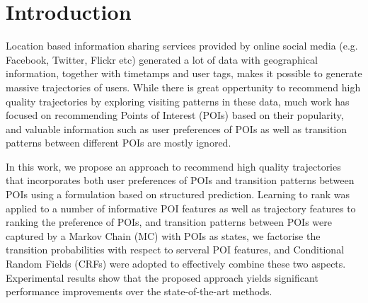 \section{Introduction}
\label{sec:introduction}
Location based information sharing services provided by online social media 
(e.g. Facebook, Twitter, Flickr etc) generated a lot of data with geographical information, 
together with timetamps and user tags, makes it possible to generate massive trajectories of users.
While there is great oppertunity to recommend high quality trajectories by exploring visiting patterns
in these data, much work has focused on recommending Points of Interest (POIs) based on their
popularity\cite{}, and valuable information such as user preferences of POIs as well as transition
patterns between different POIs are mostly ignored.

In this work, we propose an approach to recommend high quality trajectories that incorporates both user 
preferences of POIs and transition patterns between POIs using a formulation based on structured prediction.
Learning to rank was applied to a number of informative POI features as well as trajectory features to ranking
the preference of POIs, and transition patterns between POIs were captured by a Markov Chain (MC) with POIs as states,
we factorise the transition probabilities with respect to serveral POI features, and Conditional Random Fields (CRFs) 
were adopted to effectively combine these two aspects. 
Experimental results show that the proposed approach yields significant performance improvements over the state-of-the-art methods.
















